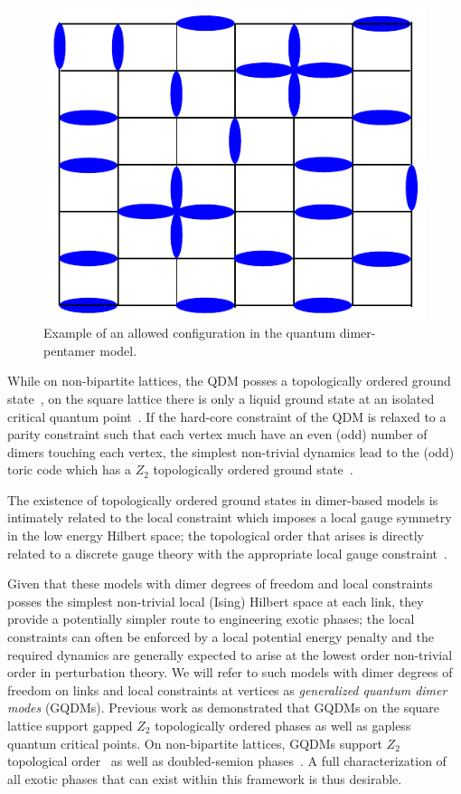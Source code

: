 \documentclass[twocolumn,prb,aps,floatfix,superscriptaddress]{revtex4-1}
\begin{document}
\begin{figure}[t!]
    \centering
    \includegraphics[width=0.5\columnwidth]{QDPM_ex_config.pdf}
    \caption{Example of an allowed configuration in the quantum dimer-pentamer model.}
    \label{fig:QDPMex}
\end{figure}

While on non-bipartite lattices, the QDM posses a topologically ordered ground state~\cite{Moessner2001a,Fendley2002}, on the square lattice there is only a liquid ground state at an isolated critical quantum point~\cite{Leung1996,Syljuasen2006}. If the hard-core constraint of the QDM is relaxed to a parity constraint such that each vertex much have an even (odd) number of dimers touching each vertex, the simplest non-trivial dynamics lead to the (odd) toric code which has a $Z_2$ topologically ordered ground state~\cite{Kitaev2003,Wen2003}. 

The existence of topologically ordered ground states in dimer-based models is intimately related to the local constraint which imposes a local gauge symmetry in the low energy Hilbert space; the topological order that arises is directly related to a discrete gauge theory with the appropriate local gauge constraint~\cite{Moessner2001}.

Given that these models with dimer degrees of freedom and local constraints posses the simplest non-trivial local (Ising) Hilbert space at each link, they provide a potentially simpler route to engineering exotic phases; the local constraints can often be enforced by a local potential energy penalty and the required dynamics are generally expected to arise at the lowest order non-trivial order in perturbation theory. We will refer to such models with dimer degrees of freedom on links and local constraints at vertices as \emph{generalized quantum dimer modes} (GQDMs). Previous work as demonstrated that GQDMs on the square lattice support gapped $Z_2$ topologically ordered phases as well as gapless quantum critical points. On non-bipartite lattices, GQDMs support $Z_2$ topological order~\cite{Moessner2001a,Misguich2002} as well as doubled-semion phases~\cite{Qi2014,Buerschaper2014a}. A full characterization of all exotic phases that can exist within this framework is thus desirable.
\end{document}
